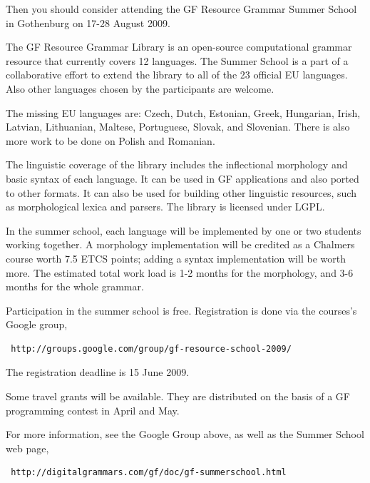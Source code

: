 \documentclass[11pt]{article}
\begin{document}
Then you should consider attending the GF Resource Grammar Summer School 
in Gothenburg on 17-28 August 2009.

The GF Resource Grammar Library is an open-source computational grammar resource
that currently covers 12 languages. The Summer School is a part of a 
collaborative effort to extend the library to all of the 23 official 
EU languages. Also other languages chosen by the participants are welcome.

The missing EU languages are: 
Czech, Dutch, Estonian, Greek, Hungarian, Irish, Latvian, Lithuanian,
Maltese, Portuguese, Slovak, and Slovenian. There is also more work to
be done on Polish and Romanian.

The linguistic coverage of the library includes the inflectional morphology
and basic syntax of each language. It can be used in GF applications
and also ported to other formats. It can also be used for building other
linguistic resources, such as morphological lexica and parsers.
The library is licensed under LGPL.

In the summer school, each language will be implemented by one or two students
working together. A morphology implementation will be credited
as a Chalmers course worth 7.5 ETCS points; adding a syntax implementation
will be worth more. The estimated total work load is 1-2 months for the
morphology, and 3-6 months for the whole grammar.

Participation in the summer school is free. 
Registration is done via the courses's Google group,

\begin{verbatim}
 http://groups.google.com/group/gf-resource-school-2009/
\end{verbatim}
The registration deadline is 15 June 2009.

Some travel grants will be available. They are distributed on the basis of a
GF programming contest in April and May.

For more information, see the Google Group above, as well as the 
Summer School web page,

\begin{verbatim}
 http://digitalgrammars.com/gf/doc/gf-summerschool.html
\end{verbatim}

\end{document}

